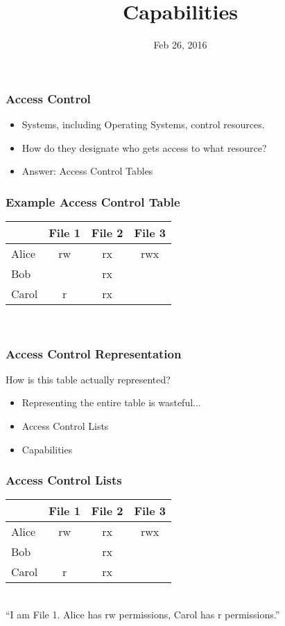 \documentclass[xcolor=table]{beamer}
\title{Capabilities}
\date{Feb 26, 2016}
\begin{document}
\frame{\titlepage}

\begin{frame}
  \frametitle{Access Control}
  \begin{itemize}
  \item Systems, including Operating Systems, control resources.
  \item How do they designate who gets access to what resource?
  \item Answer: Access Control Tables
  \end{itemize}
\end{frame}

\begin{frame}
  \frametitle{Example Access Control Table}
  \begin{center}
    \begin{tabular}{|l||c|c|c|}
      \hline
      &File 1&File 2&File 3\\
      \hline
      \hline
      Alice&rw&rx&rwx\\
      \hline
      Bob&&rx&\\
      \hline
      Carol&r&rx&\\
      \hline
    \end{tabular}\\
    \vspace{10pt}
  \end{center}
\end{frame}

\begin{frame}
  \frametitle{Access Control Representation}
  How is this table actually represented?
  \begin{itemize}
  \item Representing the entire table is wasteful... \pause
  \item Access Control Lists
  \item Capabilities
  \end{itemize}
\end{frame}

\begin{frame}
  \frametitle{Access Control Lists}
  \begin{center}
    \begin{tabular}{|l||c|c|c|}
      \hline
      &\cellcolor{green}File 1&File 2&File 3\\
      \hline
      \hline
      Alice&\cellcolor{green}rw&rx&rwx\\
      \hline
      Bob&\cellcolor{green}&rx&\\
      \hline
      Carol&\cellcolor{green}r&rx&\\
      \hline
    \end{tabular}\\
    \vspace{10pt}
    ``I am File 1. Alice has rw permissions, Carol has r permissions.''
  \end{center}
\end{frame}
\end{document}
